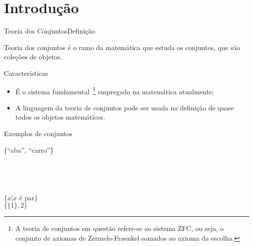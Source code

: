 
\frame{\maketitle}


\section{Introdução}

\begin{frame}{Teoria dos Conjuntos}{Definição}

Teoria dos conjuntos é o ramo da matemática que estuda os conjuntos,
que são coleções de objetos.

\begin{block}{Características}

  \begin{itemize}
  \item É o sistema fundamental~\footnote{A teoria de conjuntos em
      questão refere-se ao sistema ZFC, ou seja, o conjunto de
      axiomas de Zermelo-Fraenkel somados ao axioma da escolha.}
    empregado na matemática atualmente;
  \item A linguagem da teoria de conjuntos pode ser usada na definição
    de quase todos os objetos matemáticos.
  \end{itemize}
  
\end{block}
  
\end{frame}

\begin{frame}{Exemplos de conjuntos}
  
  \begin{tabbing}
    \{``aba'', ``carro''\}\=   \\
     \> \\
     \> \\
     \> \\
    \eumath{\emptyset} \> \\
    $\{x|x$ é par$\}$\> \\
    $\{\{1\},2\}$ \> 
  \end{tabbing}

\end{frame}

